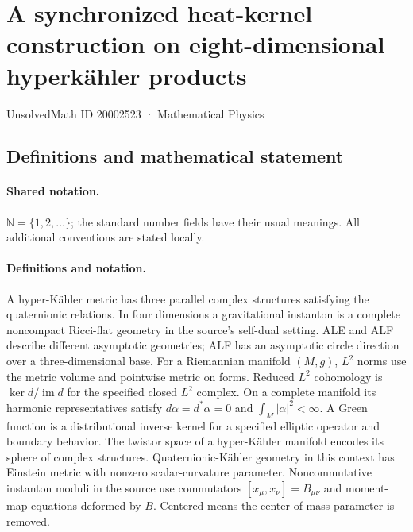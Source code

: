 \documentclass[11pt]{article}
\begin{document}
\setcounter{section}{20002522}
\section{A synchronized heat-kernel construction on eight-dimensional hyperkähler products}\label{20002523}
{\small UnsolvedMath ID 20002523 · Mathematical Physics}
\subsection{Definitions and mathematical statement}

\paragraph{Shared notation.}$\mathbb N=\{1,2,\ldots\}$; the standard number fields have their usual meanings. All additional conventions are stated locally.


\paragraph{Definitions and notation.}A hyper-Kähler metric has three parallel complex structures satisfying the quaternionic relations. In four dimensions a gravitational instanton is a complete noncompact Ricci-flat geometry in the source’s self-dual setting. ALE and ALF describe different asymptotic geometries; ALF has an asymptotic circle direction over a three-dimensional base. For a Riemannian manifold $(M,g)$, $L^2$ norms use the metric volume and pointwise metric on forms. Reduced $L^2$ cohomology is $\ker d/\overline{\operatorname{im}d}$ for the specified closed $L^2$ complex. On a complete manifold its harmonic representatives satisfy $d\alpha=d^*\alpha=0$ and $\int_M|\alpha|^2<\infty$. A Green function is a distributional inverse kernel for a specified elliptic operator and boundary behavior. The twistor space of a hyper-Kähler manifold encodes its sphere of complex structures. Quaternionic-Kähler geometry in this context has Einstein metric with nonzero scalar-curvature parameter. Noncommutative instanton moduli in the source use commutators $[x_\mu,x_\nu]=B_{\mu\nu}$ and moment-map equations deformed by $B$. Centered means the center-of-mass parameter is removed.
\end{document}
